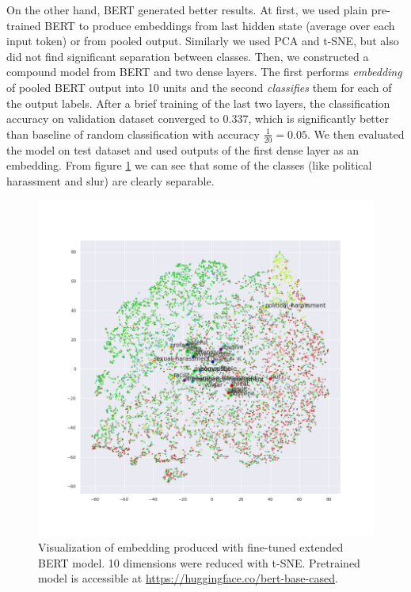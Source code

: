 \documentclass[fleqn,moreauthors,10pt]{ds_report}
\begin{document}
On the other hand, BERT generated better results. At first, we used plain pre-trained BERT to produce embeddings from last hidden state (average over each input token) or from pooled output. Similarly we used PCA and t-SNE, but also did not find significant separation between classes. Then, we constructed a compound model from BERT and two dense layers. The first performs \textit{embedding} of pooled BERT output into 10 units and the second \textit{classifies} them for each of the output labels. After a brief training of the last two layers, the classification accuracy on validation dataset converged to $0.337$, which is significantly better than baseline of random classification with accuracy $\frac{1}{20} = 0.05$. We then evaluated the model on test dataset and used outputs of the first dense layer as an embedding. From figure \ref{fig:bert_tsne} we can see that some of the classes (like political harassment and slur) are clearly separable.

\begin{figure}[h]
    \centering
    \includegraphics[width=\linewidth]{bert_sent_embed_tsne.png}
    \caption{Visualization of embedding produced with fine-tuned extended BERT model. 10 dimensions were reduced with t-SNE. Pretrained model is accessible at \url{https://huggingface.co/bert-base-cased}.}
    \label{fig:bert_tsne}
\end{figure}
\end{document}
